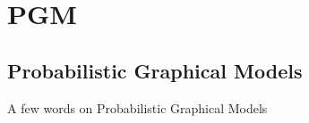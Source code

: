 \documentclass[xcolor=x11names,compress]{beamer}
\begin{document}



\scriptsize
\section{PGM}
\scriptsize
\subsection{Probabilistic Graphical Models}
{ 
  \begin{frame}
    \begin{center}
      {\large A few words on Probabilistic Graphical Models}
    \end{center}
    
  \end{frame}
}
\end{document}
